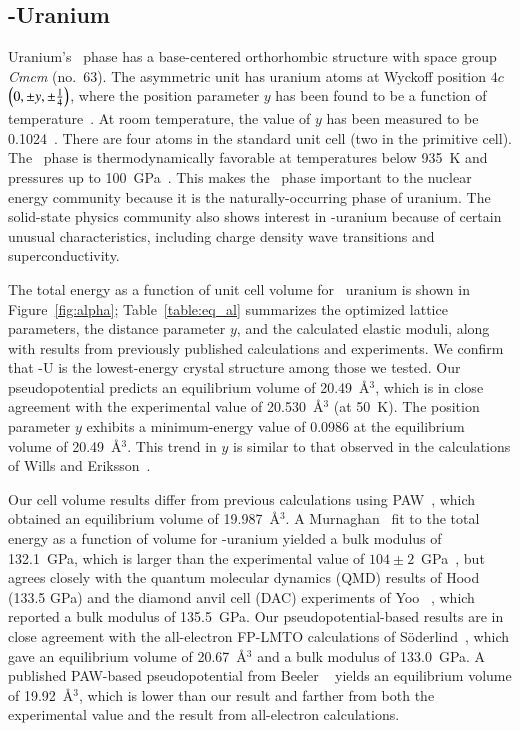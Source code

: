 \subsection{\textalpha-Uranium} \label{subsec_alphaU}
Uranium's \textalpha\ phase has a base-centered orthorhombic structure with
space group \textit{Cmcm} (no.~63). The asymmetric unit has uranium atoms at
Wyckoff position $4c$ $\Bigl(0, \pm y, \pm\frac{1}{4}\Bigr)$, where the
position parameter $y$ has been found to be a function of
temperature~\cite{barrett1963crystal}.
At room temperature, the value of $y$ has been measured to be
0.1024~\cite{barrett1963crystal,lander1994solid}. There are four atoms in the
standard unit cell (two in the primitive cell).
The \textalpha\ phase is thermodynamically favorable at temperatures below
935~K and pressures up to 100~GPa~\cite{le2003structural,akella1997structural}.
This makes the \textalpha\ phase important to the nuclear energy community
because it is the naturally-occurring phase of uranium. The solid-state physics
community also shows interest in \textalpha-uranium because of certain unusual
characteristics, including charge density wave transitions and
superconductivity.

The total energy as a function of unit cell volume for \textalpha~uranium is
shown in Figure~\ref{fig:alpha}; Table~\ref{table:eq_al} summarizes the
optimized lattice parameters, the distance parameter $y$, and the calculated
elastic moduli, along with results from previously published calculations
and experiments. We confirm that \textalpha-U is the lowest-energy crystal
structure among those we tested. Our pseudopotential predicts an equilibrium
volume of 20.49~\AA$^3$, which is in close agreement with the experimental
value of 20.530~\AA$^3$ (at 50~K)\@. The position parameter $y$ exhibits a
minimum-energy 
value of 0.0986 at the equilibrium volume of 20.49~\AA$^3$.
This trend in $y$ is similar to that observed in the calculations of
Wills and Eriksson~\cite{wills1992crystal}.

Our cell volume results differ from previous calculations using
PAW~\cite{beeler2013first}, which obtained an equilibrium volume of
19.987~\AA$^3$. A Murnaghan~\cite{murnaghan1944compressibility} fit to the
total energy as a function of volume for \textalpha-uranium yielded a bulk
modulus of 132.1~GPa, which is larger than the experimental value of
$104 \pm 2$~GPa~\cite{le2003structural},
but agrees closely with the quantum molecular dynamics (QMD) results of
Hood \etal~\cite{hood2008quantum} (133.5 GPa)
and the diamond anvil cell (DAC) experiments of Yoo \etal~\cite{yoo1998phase},
which reported a bulk modulus of 135.5~GPa. Our pseudopotential-based results
are in close agreement with the all-electron FP-LMTO calculations of
S{\"o}derlind~\cite{soderlind2002first}, which gave an equilibrium volume of
20.67~\AA$^3$ and a bulk modulus of 133.0~GPa. A published PAW-based
pseudopotential from Beeler \etal~\cite{beeler2013first} yields an equilibrium
volume of 19.92~\AA$^3$, which is lower than our result and farther from both
the experimental value and the result from all-electron calculations.

